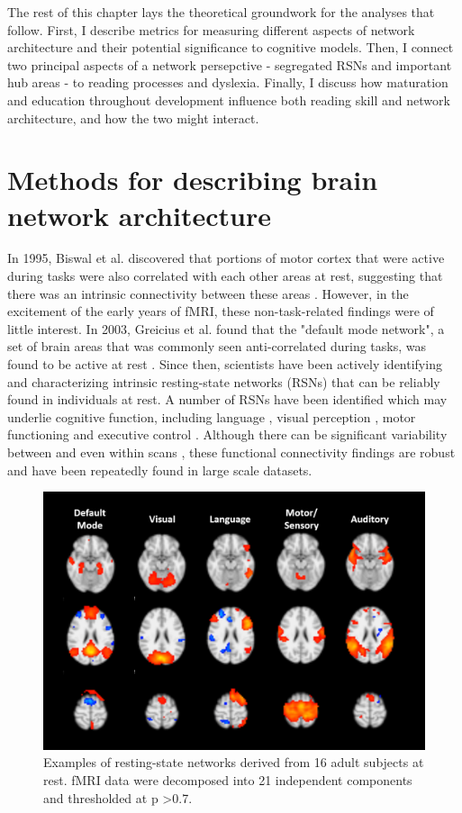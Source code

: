 The rest of this chapter lays the theoretical groundwork for the analyses that follow. First, I describe metrics for measuring different aspects of network architecture and their potential significance to cognitive models. Then, I connect two principal aspects of a network persepctive - segregated RSNs and important hub areas - to reading processes and dyslexia. Finally, I discuss how maturation and education throughout development influence both reading skill and network architecture, and how the two might interact. 


\section{Methods for describing brain network architecture}

In 1995, Biswal et al. discovered that portions of motor cortex that were active during tasks were also correlated with each other areas at rest, suggesting that there was an intrinsic connectivity between these areas \cite{Biswal1995}. However, in the excitement of the early years of fMRI, these non-task-related findings were of little interest. In 2003, Greicius et al. found that the "default mode network", a set of brain areas that was commonly seen anti-correlated during tasks, was found to be active at rest \cite{Greicius2003}. Since then, scientists have been actively identifying and characterizing intrinsic resting-state networks (RSNs) that can be reliably found in individuals at rest. A number of RSNs have been identified which may underlie cognitive function, including language \cite{Cordes2000, Hampson2002}, visual perception \cite{Cordes2000, Simmons2012}, motor functioning \cite{Biswal1995} and executive control \cite{Seeley2007, Simmons2012}. Although there can be significant variability between and even within scans \cite{Honey2009}, these functional connectivity findings are robust and have been repeatedly found in large scale datasets.

\begin{figure}[t]
    \centering
    \includegraphics[width=12cm]{images/ch1-ica.png}
    \caption[Examples of resting-state networks.]{Examples of resting-state networks derived from 16 adult subjects at rest. fMRI data were decomposed into 21 independent components and thresholded at p \textgreater 0.7.} 
\end{figure}

